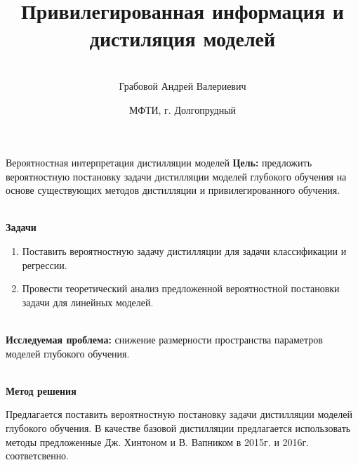 \documentclass[10pt,pdf,hyperref={unicode}]{beamer}
\title[\hbox to 56mm{истилляция и привилегированная информация \hfill\insertframenumber\,/\,\inserttotalframenumber}]
{Привилегированная информация и дистиляция моделей}
\author[А.\,В.~Грабовой]{\large \\Грабовой Андрей Валериевич}
\institute{\large
Московский физико-технический институт}
\date{\footnotesize{МФТИ, г. Долгопрудный}}
\begin{document}
\begin{frame}
\titlepage
\end{frame}

\begin{frame}{Вероятностная интерпретация дистилляции моделей}
\justifying
\textbf{Цель:} предложить вероятностную постановку задачи дистилляции моделей глубокого обучения на основе существующих методов дистилляции и привилегированного обучения.



~\\
\textbf{Задачи}

\begin{enumerate}
\justifying
	\item Поставить вероятностную задачу дистилляции для задачи классификации и регрессии.
	\item Провести теоретический анализ предложенной вероятностной постановки задачи для линейных моделей.
\end{enumerate}

~\\
\textbf{Исследуемая проблема:} снижение размерности пространства параметров моделей глубокого обучения.

~\\
\textbf{Метод решения}

	Предлагается поставить вероятностную постановку задачи дистилляции моделей глубокого обучения. В качестве базовой дистилляции предлагается использовать методы предложенные Дж. Хинтоном и В. Вапником в 2015г. и 2016г. соответсвенно.
	
\end{frame}
\end{document}
